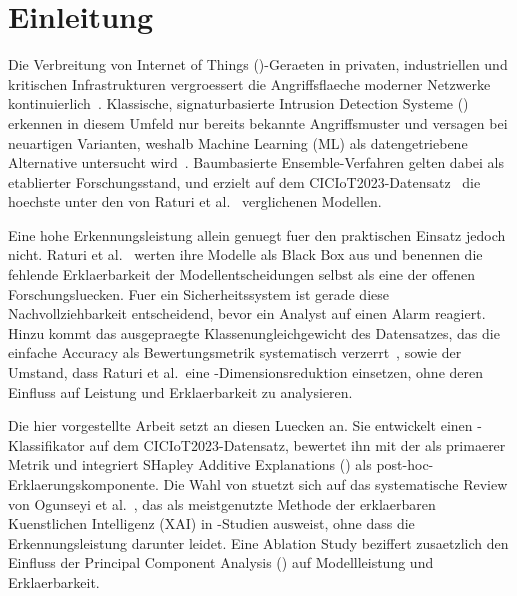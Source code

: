 \section{Einleitung}\label{einleitung}

Die Verbreitung von Internet of Things (\iot{})-Geraeten in privaten, industriellen und
kritischen Infrastrukturen vergroessert die Angriffsflaeche moderner Netzwerke
kontinuierlich~\cite{hamedani2025iotsurvey}.
Klassische, signaturbasierte Intrusion Detection Systeme (\ids{}) erkennen in diesem Umfeld
nur bereits bekannte Angriffsmuster und versagen bei neuartigen Varianten, weshalb Machine
Learning (ML) als datengetriebene Alternative untersucht wird~\cite{kikissagbe2024review}.
Baumbasierte Ensemble-Verfahren gelten dabei als etablierter Forschungsstand, und \gb{}
erzielt auf dem CICIoT2023-Datensatz~\cite{neto2023ciciot2023} die hoechste \ba{} unter den
von Raturi et al.\ \cite{raturi2026exploratory} verglichenen Modellen.

Eine hohe Erkennungsleistung allein genuegt fuer den praktischen Einsatz jedoch nicht.
Raturi et al.\ \cite{raturi2026exploratory} werten ihre Modelle als Black Box aus und benennen
die fehlende Erklaerbarkeit der Modellentscheidungen selbst als eine der offenen
Forschungsluecken.
Fuer ein Sicherheitssystem ist gerade diese Nachvollziehbarkeit entscheidend, bevor ein Analyst
auf einen Alarm reagiert.
Hinzu kommt das ausgepraegte Klassenungleichgewicht des Datensatzes, das die einfache Accuracy
als Bewertungsmetrik systematisch verzerrt~\cite{hosseini2025imbalance}, sowie der Umstand, dass
Raturi et al.\ eine \pca{}-Dimensionsreduktion einsetzen, ohne deren Einfluss auf Leistung und
Erklaerbarkeit zu analysieren.

Die hier vorgestellte Arbeit setzt an diesen Luecken an.
Sie entwickelt einen \gb{}-Klassifikator auf dem CICIoT2023-Datensatz, bewertet ihn mit der
\ba{} als primaerer Metrik und integriert SHapley Additive Explanations (\shap{}) als
post-hoc-Erklaerungskomponente.
Die Wahl von \shap{} stuetzt sich auf das systematische Review von Ogunseyi et
al.~\cite{ogunseyi2026xai_review}, das \shap{} als meistgenutzte Methode der erklaerbaren
Kuenstlichen Intelligenz (XAI) in \ids{}-Studien ausweist, ohne dass die Erkennungsleistung
darunter leidet.
Eine Ablation Study beziffert zusaetzlich den Einfluss der Principal Component Analysis
(\pca{}) auf Modellleistung und Erklaerbarkeit.


